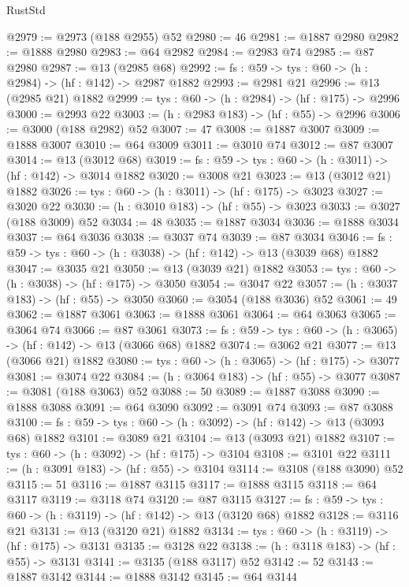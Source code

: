 \begin{lexlean}{RustStd}
\begin{coremodule}
@2979 := @2973 (@188 @2955) @52
@2980 := 46
@2981 := @1887 @2980
@2982 := @1888 @2980
@2983 := @64 @2982
@2984 := @2983 @74
@2985 := @87 @2980
@2987 := @13 (@2985 @68)
@2992 := {fs : @59} -> {tys : @60} -> (h : @2984) -> (hf : @142) -> @2987 @1882
@2993 := @2981 @21
@2996 := @13 (@2985 @21) @1882
@2999 := {tys : @60} -> (h : @2984) -> (hf : @175) -> @2996
@3000 := @2993 @22
@3003 := (h : @2983 @183) -> (hf : @55) -> @2996
@3006 := @3000 (@188 @2982) @52
@3007 := 47
@3008 := @1887 @3007
@3009 := @1888 @3007
@3010 := @64 @3009
@3011 := @3010 @74
@3012 := @87 @3007
@3014 := @13 (@3012 @68)
@3019 := {fs : @59} -> {tys : @60} -> (h : @3011) -> (hf : @142) -> @3014 @1882
@3020 := @3008 @21
@3023 := @13 (@3012 @21) @1882
@3026 := {tys : @60} -> (h : @3011) -> (hf : @175) -> @3023
@3027 := @3020 @22
@3030 := (h : @3010 @183) -> (hf : @55) -> @3023
@3033 := @3027 (@188 @3009) @52
@3034 := 48
@3035 := @1887 @3034
@3036 := @1888 @3034
@3037 := @64 @3036
@3038 := @3037 @74
@3039 := @87 @3034
@3046 := {fs : @59} -> {tys : @60} -> (h : @3038) -> (hf : @142) -> @13 (@3039 @68) @1882
@3047 := @3035 @21
@3050 := @13 (@3039 @21) @1882
@3053 := {tys : @60} -> (h : @3038) -> (hf : @175) -> @3050
@3054 := @3047 @22
@3057 := (h : @3037 @183) -> (hf : @55) -> @3050
@3060 := @3054 (@188 @3036) @52
@3061 := 49
@3062 := @1887 @3061
@3063 := @1888 @3061
@3064 := @64 @3063
@3065 := @3064 @74
@3066 := @87 @3061
@3073 := {fs : @59} -> {tys : @60} -> (h : @3065) -> (hf : @142) -> @13 (@3066 @68) @1882
@3074 := @3062 @21
@3077 := @13 (@3066 @21) @1882
@3080 := {tys : @60} -> (h : @3065) -> (hf : @175) -> @3077
@3081 := @3074 @22
@3084 := (h : @3064 @183) -> (hf : @55) -> @3077
@3087 := @3081 (@188 @3063) @52
@3088 := 50
@3089 := @1887 @3088
@3090 := @1888 @3088
@3091 := @64 @3090
@3092 := @3091 @74
@3093 := @87 @3088
@3100 := {fs : @59} -> {tys : @60} -> (h : @3092) -> (hf : @142) -> @13 (@3093 @68) @1882
@3101 := @3089 @21
@3104 := @13 (@3093 @21) @1882
@3107 := {tys : @60} -> (h : @3092) -> (hf : @175) -> @3104
@3108 := @3101 @22
@3111 := (h : @3091 @183) -> (hf : @55) -> @3104
@3114 := @3108 (@188 @3090) @52
@3115 := 51
@3116 := @1887 @3115
@3117 := @1888 @3115
@3118 := @64 @3117
@3119 := @3118 @74
@3120 := @87 @3115
@3127 := {fs : @59} -> {tys : @60} -> (h : @3119) -> (hf : @142) -> @13 (@3120 @68) @1882
@3128 := @3116 @21
@3131 := @13 (@3120 @21) @1882
@3134 := {tys : @60} -> (h : @3119) -> (hf : @175) -> @3131
@3135 := @3128 @22
@3138 := (h : @3118 @183) -> (hf : @55) -> @3131
@3141 := @3135 (@188 @3117) @52
@3142 := 52
@3143 := @1887 @3142
@3144 := @1888 @3142
@3145 := @64 @3144

\end{coremodule}
\end{lexlean}
